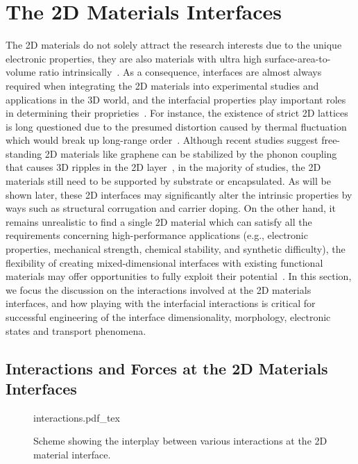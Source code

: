 \section{The 2D Materials Interfaces}
\label{sec:2d-mater-interf}
The 2D materials do not solely attract the research interests due to
the unique electronic properties, they are also materials with ultra
high surface-area-to-volume ratio
intrinsically~\cite{Liu_2018_rev,Novoselov_2016_vdW}.
%
As a consequence,
interfaces are almost always required when integrating the 2D
materials into experimental studies and applications in the 3D world,
and the interfacial properties play important roles in determining
their proprieties~\cite{Liu_2018_rev}.
% 
For instance, the existence of strict 2D lattices is long questioned
due to the presumed distortion caused by thermal fluctuation which
would break up long-range
order~\cite{Peierls_1935_unstable,landau_2009_statistical_Phys_book}.
%
Although recent studies suggest free-standing 2D materials like
graphene can be stabilized by the phonon coupling that causes 3D
ripples in the 2D
layer~\cite{Fasolino_2007_ripple,Brivio_2011_mos2_ripple}, in the
majority of studies, the 2D materials still need to be supported by
substrate or encapsulated.  As will be shown later, these 2D
interfaces may significantly alter the intrinsic properties by ways
such as structural corrugation and carrier doping.
%
On the other hand, it remains unrealistic to find a single 2D material
which can satisfy all the requirements concerning high-performance
applications (e.g., electronic properties, mechanical strength,
chemical stability, and synthetic difficulty), the flexibility of
creating mixed-dimensional interfaces with existing functional
materials may offer opportunities to fully exploit their
potential~\cite{Jariwala_2016_mixed_vdw_het}.
%
In this section, we focus the discussion on the
interactions involved at the 2D materials interfaces,
and how playing with the
interfacial interactions is critical for successful engineering of the
interface dimensionality, morphology, electronic states and transport
phenomena.

\subsection{Interactions and Forces at the 2D Materials Interfaces}
\label{sec:inter-forc-at}

\begin{figure}[htbp]
  \centering
  {interactions.pdf_tex}
  \caption{\label{fig:intro-interactions} %
    Scheme showing the interplay between various interactions at the
    2D material interface.
  }
\end{figure}

